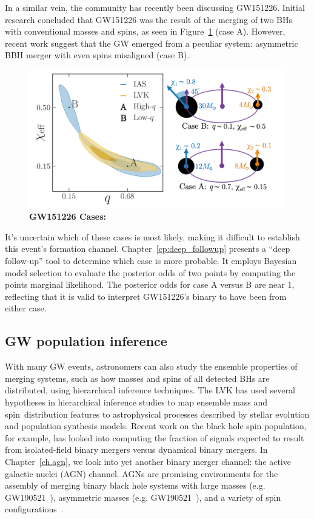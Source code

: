 In a similar vein, the community has recently been discussing GW151226. 
Initial research concluded that GW151226 was the result of the merging of two BHs with conventional masses and spins, as seen in Figure~\ref{fig:gw151226_cases} (case A).
However, recent work suggest that the GW emerged from a peculiar system: asymmetric BBH merger with even spins misaligned (case B).

\begin{figure}
\begin{center}
  \centerline{\includegraphics[width=1.1\linewidth]{src/figures/gw151226_cases.png}}
  \caption{\textbf{GW151226 Cases:}  }
  \label{fig:gw151226_cases}
\end{center}
\end{figure}

It's uncertain which of these cases is most likely, making it difficult to establish this event's formation channel.
Chapter~\ref{cp:deep_followup} presents a ``deep follow-up'' tool to determine which case is  more probable.
It employs Bayesian model selection to evaluate the posterior odds of two points by computing the points marginal likelihood.
The posterior odds for case A versus B are near 1, reflecting that it is valid to interpret GW151226's binary to have been from either case.

\subsection{GW population inference}

With many GW events, astronomers can also study the ensemble properties of merging systems, such as how masses and spins of all detected BHs are distributed, using hierarchical inference techniques.
The LVK has used several hypotheses in hierarchical inference studies to map ensemble mass and spin distribution features to astrophysical processes  described by stellar evolution and population synthesis models.
Recent work on the black hole spin population, for example, has looked into computing the fraction of signals expected to result from isolated-field binary mergers versus dynamical binary mergers.
In Chapter~\ref{ch.agn}, we look into yet another binary merger channel: the active galactic nuclei (AGN) channel.
AGNs are promising environments for the assembly of merging binary black hole systems with large masses (e.g. GW190521~\cite{gw190521_agn}), asymmetric masses (e.g. GW190521~\cite{gw190425_agn}), and a variety of spin configurations~\cite{agn_spin_population_models}. 

